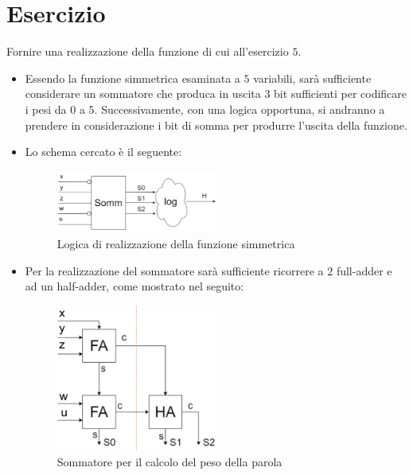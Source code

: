 \documentclass[a4paper]{extarticle}
\begin{document}
\noindent
\section{Esercizio}
Fornire una realizzazione della funzione di cui all'esercizio $5$.

\begin{itemize}
    \item Essendo la funzione simmetrica esaminata a $5$ variabili, sarà sufficiente considerare un sommatore che produca in uscita $3$ bit sufficienti per codificare i pesi da $0$ a $5$. Successivamente, con una logica opportuna, si andranno a prendere in considerazione i bit di somma per produrre l'uscita della funzione.
    
    \item Lo schema cercato è il seguente:

    \begin{figure}[H]
        \centering
        \includegraphics[width=0.5\textwidth]{logica-realizzazione-funzione-simmetrica.png}
        \caption{Logica di realizzazione della funzione simmetrica}
        \label{fig:logica_realizzazione_funzione_simmetrica}
    \end{figure}

    \item Per la realizzazione del sommatore sarà sufficiente ricorrere a $2$ full-adder e ad un half-adder, come mostrato nel seguito:
    
    \begin{figure}[H]
        \centering
        \includegraphics[width=0.5\textwidth]{sommatore-calcolo-peso-parola.png}
        \caption{Sommatore per il calcolo del peso della parola}
        \label{fig:sommatore_calcolo_peso_parola}
    \end{figure}
    

\end{itemize}
\end{document}
